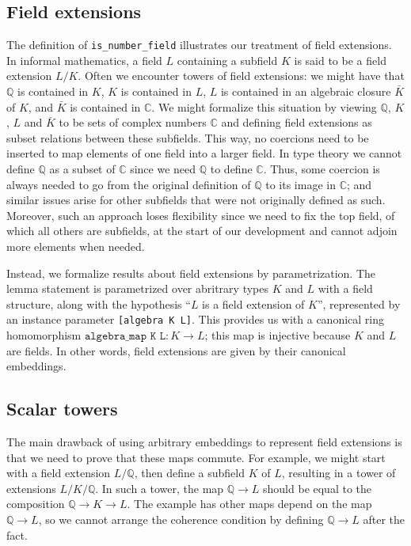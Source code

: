 \documentclass[a4paper,USenglish,cleveref, autoref, thm-restate]{lipics-v2021}
\newcommand{\C}{\mathbb{C}}
\newcommand{\lean}[1]{\texttt{#1}\xspace} %
\newcommand{\Q}{\mathbb{Q}}
\begin{document}
\subsection{Field extensions}

The definition of \lean{is\_number\_field} illustrates our treatment of field extensions.
In informal mathematics, a field $L$ containing a subfield $K$ is said to be a field extension $L / K$.
Often we encounter towers of field extensions: we might have that $\Q$ is contained in $K$, $K$ is contained in $L$, $L$ is contained in an algebraic closure $\bar{K}$ of $K$, and $\bar{K}$ is contained in $\C$.
We might formalize this situation by viewing $\Q$, $K$, $L$ and $\bar{K}$ to be sets of complex numbers $\C$ and defining field extensions as subset relations between these subfields.
This way, no coercions need to be inserted to map elements of one field into a larger field.
In type theory we cannot define $\Q$ as a subset of $\C$ since we need $\Q$ to define $\C$.
Thus, some coercion is always needed to go from the original definition of $\Q$ to its image in $\C$; and similar issues arise for other subfields that were not originally defined as such.
Moreover, such an approach loses flexibility since we need to fix the top field, of which all others are subfields, at the start of our development and cannot adjoin more elements when needed.

Instead, we formalize results about field extensions by parametrization.
The lemma statement is parametrized over abritrary types $K$ and $L$ with a field structure,
along with the hypothesis ``$L$ is a field extension of $K$'', represented by an instance parameter \lean{[algebra K L]}.
This provides us with a canonical ring homomorphism $\lean{algebra\_map K L} : K \to L$; this map is injective because $K$ and $L$ are fields.
In other words, field extensions are given by their canonical embeddings.

\subsection{Scalar towers} \label{sec:scalar_tower}

The main drawback of using arbitrary embeddings to represent field extensions is that we need to prove that these maps commute.
For example, we might start with a field extension $L / \Q$, then define a subfield $K$ of $L$,
resulting in a tower of extensions $L / K / \Q$.
In such a tower, the map $\Q \to L$ should be equal to the composition $\Q \to K \to L$.
The example has other maps depend on the map $\Q \to L$, so we cannot arrange the coherence condition by defining $\Q \to L$ after the fact.
\end{document}

